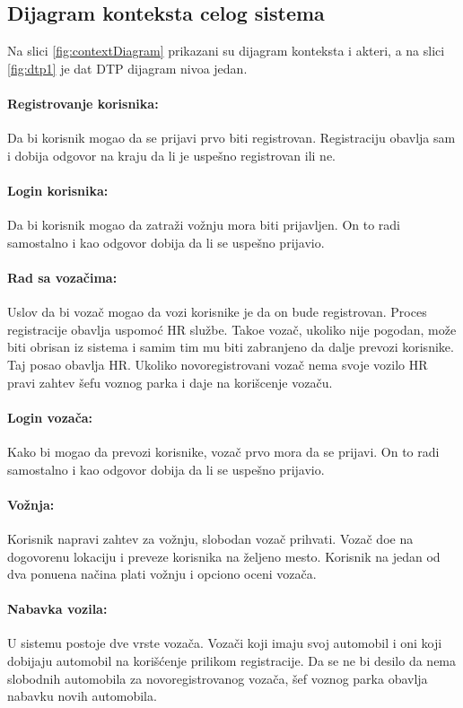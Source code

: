 \documentclass{article}
\begin{document}
\subsection{\bfseries Dijagram konteksta celog sistema}

\quad Na slici \ref{fig:contextDiagram} prikazani su dijagram konteksta i akteri, a na slici \ref{fig:dtp1} je dat DTP dijagram nivoa jedan.
\paragraph{Registrovanje korisnika:}
    Da bi korisnik mogao da se prijavi prvo biti registrovan. Registraciju obavlja sam i dobija odgovor na kraju da li je uspe\v sno registrovan ili ne.
\paragraph{Login korisnika:}
    Da bi korisnik mogao da zatra\v zi vo\v znju mora biti prijavljen. On to radi samostalno i kao odgovor dobija da li se uspe\v sno prijavio.
\paragraph{Rad sa voza\v cima:}
    Uslov da bi voza\v c mogao da vozi korisnike je da on bude registrovan. Proces registracije obavlja uspomo\' c HR slu\v zbe. Tako\dj e voza\v c, ukoliko nije pogodan, mo\v ze biti obrisan iz sistema i samim tim mu biti zabranjeno da dalje prevozi korisnike. Taj posao obavlja HR. Ukoliko novoregistrovani voza\v c nema svoje vozilo HR pravi zahtev \v sefu voznog parka i daje na kori\v scenje voza\v cu.
\paragraph{Login voza\v ca:}
    Kako bi mogao da prevozi korisnike, voza\v c prvo mora da se prijavi. On to radi samostalno i kao odgovor dobija da li se uspe\v sno prijavio.
\paragraph{Vo\v znja:}
    Korisnik napravi zahtev za vo\v znju, slobodan voza\v c prihvati. Voza\v c do\dj e na dogovorenu lokaciju i preveze korisnika na \v zeljeno mesto. Korisnik na jedan od dva ponu\dj ena na\v cina plati vo\v znju i opciono oceni voza\v ca.
\paragraph{Nabavka vozila:}
    U sistemu postoje dve vrste voza\v ca. Voza\v ci koji imaju svoj automobil i oni koji dobijaju automobil na kori\v s\' cenje prilikom registracije. Da se ne bi desilo da nema slobodnih automobila za novoregistrovanog voza\v ca, \v sef voznog parka obavlja nabavku novih automobila.
\end{document}

